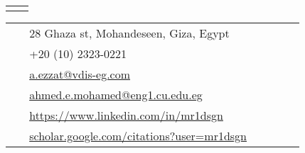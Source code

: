 \documentclass[10pt]{article} %
\begin{document}
\begin{paracol}{2}
\begin{supertabular}{rl} %
	
	
\end{supertabular}





\medskip %
\medskip %
\switchcolumn %


\parbox[top][0.12\textheight][c]{\linewidth}{ %
	\vspace{-0.04\textheight} %
	\colorbox{shade}{ %
		\begin{supertabular}{p{0.05\linewidth}|p{0.775\linewidth}} %
			\raisebox{-1pt}{\faHome} & 28 Ghaza st, Mohandeseen, Giza, Egypt \\ %
			\raisebox{-1pt}{\faPhone} & +20 (10) 2323-0221 \\ %
			\raisebox{0pt}{\small\faEnvelope} & \href{mailto:a.ezzat@vdis-eg.com}{a.ezzat@vdis-eg.com} \\ %
			\raisebox{0pt}{\small\faEnvelope} & \href{ahmed.e.mohamed@eng1.cu.edu.eg}{ahmed.e.mohamed@eng1.cu.edu.eg} \\ %
			\raisebox{-1pt}{\small\faDesktop} & \href{https://www.linkedin.com/in/mr1dsgn/}{https://www.linkedin.com/in/mr1dsgn} \\ %
			\raisebox{-1pt}{\small\faDesktop} & \href{https://scholar.google.com/citations?user=mr1dsgn}{scholar.google.com/citations?user=mr1dsgn} \\ %


\end{supertabular}}}
\end{paracol}
\end{document}
